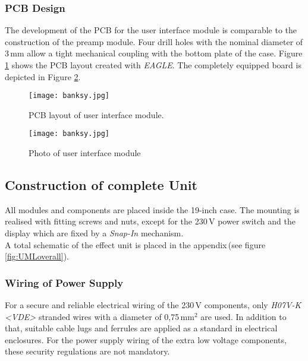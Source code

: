 \subsubsection{PCB Design}

The development of the PCB for the user interface module is comparable to the
construction of the preamp module.
Four drill holes with the nominal diameter of 3\,mm allow a tight mechanical coupling with the bottom plate of the case. Figure \ref{fig:UI_PCB} shows the PCB layout created with \textit{EAGLE}. The completely equipped board is depicted in Figure \ref{fig:UI_Photo}.
\begin{figure}[H]
	\centering \texttt{[image: banksy.jpg]}
	\caption[UI_PCB]{PCB layout of user interface module.}
	\label{fig:UI_PCB}
\end{figure}

\begin{figure}[H]
	\centering \texttt{[image: banksy.jpg]}
	\caption[UI_Photo]{Photo of user interface module}
	\label{fig:UI_Photo}
\end{figure}

\subsection{Construction of complete Unit}

All modules and components are placed inside the 19-inch case. The mounting is realised with fitting screws and nuts, except for the 230\,V power switch and the display which are fixed by a \textit{Snap-In} mechanism.\\
A total schematic of the effect unit is placed in the appendix\,(see figure  \ref{fig:UMLoverall}).



\subsubsection{Wiring of Power Supply}

For a secure and reliable electrical wiring of the 230\,V components, only \textit{H07V-K <VDE>} stranded wires with a diameter of 0,75\,mm$^2$ are used. In addition to that, suitable cable lugs and ferrules are applied as a standard in electrical enclosures.
For the power supply wiring of the extra low voltage components, these security regulations are not mandatory.

